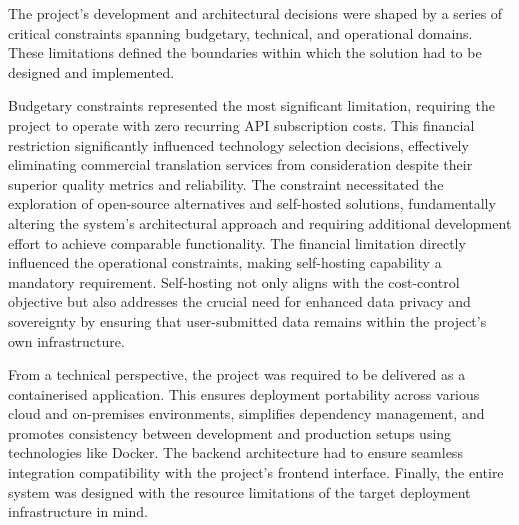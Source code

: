 The project's development and architectural decisions were shaped by a series of critical constraints spanning budgetary, technical, and operational domains. These limitations defined the boundaries within which the solution had to be designed and implemented.

Budgetary constraints represented the most significant limitation, requiring the project to operate with zero recurring API subscription costs. This financial restriction significantly influenced technology selection decisions, effectively eliminating commercial translation services from consideration despite their superior quality metrics and reliability. The constraint necessitated the exploration of open-source alternatives and self-hosted solutions, fundamentally altering the system's architectural approach and requiring additional development effort to achieve comparable functionality. The financial limitation directly influenced the operational constraints, making self-hosting capability a mandatory requirement. Self-hosting not only aligns with the cost-control objective but also addresses the crucial need for enhanced data privacy and sovereignty by ensuring that user-submitted data remains within the project's own infrastructure.

From a technical perspective, the project was required to be delivered as a containerised application. This ensures deployment portability across various cloud and on-premises environments\cite{zhang2019selfhosted}, simplifies dependency management, and promotes consistency between development and production setups using technologies like Docker\cite{turnbull2018docker}. The backend architecture had to ensure seamless integration compatibility with the project's frontend interface\cite{gupta2021reactintegration}. Finally, the entire system was designed with the resource limitations of the target deployment infrastructure in mind\cite{apriorit2025constraints}.

